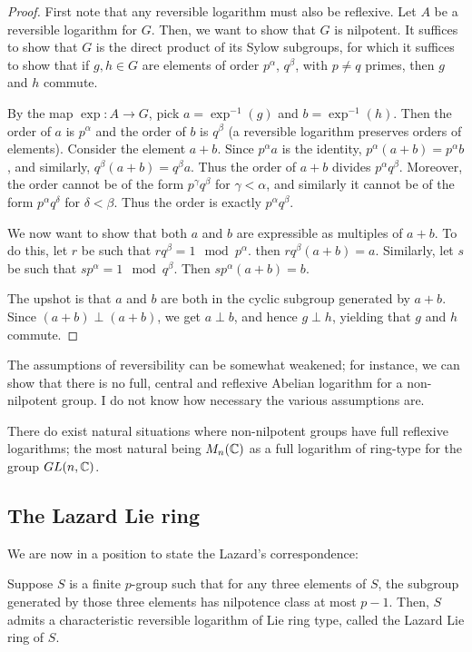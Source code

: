 \documentclass[a4paper]{amsart}
\begin{document}
\begin{proof}
  First note that any reversible logarithm must also be reflexive. Let
  $A$ be a reversible logarithm for $G$. Then, we want to show that
  $G$ is nilpotent. It suffices to show that $G$ is the direct product
  of its Sylow subgroups, for which it suffices to show that if $g,h
  \in G$ are elements of order $p^\alpha$, $q^\beta$, with $p \ne q$
  primes, then $g$ and $h$ commute. 

  By the map $\exp:A \to G$, pick $a = \exp^{-1}(g)$ and $b =
  \exp^{-1}(h)$. Then the order of $a$ is $p^\alpha$ and the order of
  $b$ is $q^\beta$ (a reversible logarithm preserves orders of
  elements). Consider the element $a + b$. Since $p^\alpha a$ is the
  identity, $p^\alpha (a + b) = p^\alpha b$, and similarly, $q^\beta(a
  + b) = q^\beta a$. Thus the order of $a + b$ divides $p^\alpha
  q^\beta$. Moreover, the order cannot be of the form $p^\gamma
  q^\beta$ for $\gamma < \alpha$, and similarly it cannot be of the
  form $p^\alpha q^\delta$ for $\delta < \beta$. Thus the order is
  exactly $p^\alpha q^\beta$.

  We now want to show that both $a$ and $b$ are expressible as
  multiples of $a + b$. To do this, let $r$ be such that $rq^\beta = 1
  \mod p^\alpha$. then $rq^\beta(a + b) = a$. Similarly, let $s$ be
  such that $sp^\alpha = 1 \mod q^\beta$. Then $sp^\alpha(a + b) = b$.

  The upshot is that $a$ and $b$ are both in the cyclic subgroup
  generated by $a + b$. Since $(a + b) \perp (a + b)$, we get $a \perp
  b$, and hence $g \perp h$, yielding that $g$ and $h$ commute.
\end{proof}

The assumptions of reversibility can be somewhat weakened; for
instance, we can show that there is no full, central and reflexive
Abelian logarithm for a non-nilpotent group. I do not know how
necessary the various assumptions are.

There do exist natural situations where non-nilpotent groups have full
reflexive logarithms; the most natural being $M_n(\mathbb{C})$ as a full
logarithm of ring-type for the group $GL(n,\mathbb{C})$.

\subsection{The Lazard Lie ring}

We are now in a position to state the Lazard's correspondence:

\begin{theorem}
  Suppose $S$ is a finite $p$-group such that for any three elements
  of $S$, the subgroup generated by those three elements has
  nilpotence class at most $p-1$. Then, $S$ admits a characteristic
  reversible logarithm of Lie ring type, called the Lazard Lie ring of
  $S$.
\end{theorem}
\end{document}

